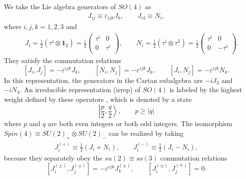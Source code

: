 \documentclass[12pt,epsf]{article}
\begin{document}
We take the Lie algebra generators of $SO(4)$ as
\begin{eqnarray} \label{so-4t}
J_{ij} \equiv \varepsilon_{ijk} J_k, \qquad J_{i4} \equiv N_{i},
\end{eqnarray}
where $i,j,k =1,2,3$ and
\begin{eqnarray} \label{abcdt}
&& J_{i} = \frac{i}{2} (\tau^i \otimes \mathbf{1}_2) = \frac{i}{2} \left(
                                   \begin{array}{cc}
                                     \tau^i & 0 \\
                                     0 & \tau^i \\
                                   \end{array}
                                 \right), \qquad
N_{i} = \frac{i}{2} (\tau^i \otimes \tau^3) = \frac{i}{2} \left(
                                   \begin{array}{cc}
                                     \tau^i & 0 \\
                                     0 & - \tau^i \\
                                   \end{array}
                                      \right).
\end{eqnarray}
They satisfy the commutation relations
\begin{equation}\label{jncomm}
  [J_i, J_j] = - \varepsilon^{ijk} J_k, \qquad [N_i, N_j] = - \varepsilon^{ijk} J_k,
  \qquad [J_i, N_j] = - \varepsilon^{ijk} N_k.
\end{equation}
In this representation, the generators in the Cartan subalgebra are $-i J_3$ and $-i N_3$.
An irreducible representation (irrep) of $SO(4)$ is labeled by the highest weight defined
by these operators \cite{book-wybo},
which is denoted by a state
\begin{equation}\label{high-w-so4}
  \left|\frac{p}{2}, \frac{q}{2} \right\rangle, \qquad  p \geq |q|
\end{equation}
where $p$ and $q$ are both even integers or both odd integers.
The isomorphism $Spin (4) \cong SU(2)_+ \otimes SU(2)_-$ can be realized by taking
\begin{eqnarray} \label{2su2}
J^{(+)}_i \equiv \frac{1}{2} (J_i + N_i), \qquad J^{(-)}_i \equiv \frac{1}{2} (J_i - N_i),
\end{eqnarray}
because they separately obey the $su(2)\cong so(3)$ commutation relations
\begin{equation}\label{2su2-comm}
  [J^{(\pm)}_i, J^{(\pm)}_j] = - \varepsilon^{ijk} J^{(\pm)}_k, \qquad [J^{(\pm)}_i, J^{(\mp)}_j] = 0.
\end{equation}
\end{document}
